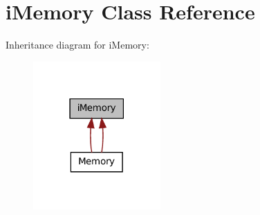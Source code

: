 \hypertarget{classiMemory}{
\section{iMemory Class Reference}
\label{classiMemory}
}


Inheritance diagram for iMemory:
\nopagebreak
\begin{figure}[H]
\begin{center}
\leavevmode
\includegraphics[width=138pt]{classiMemory__inherit__graph}
\end{center}
\end{figure}
